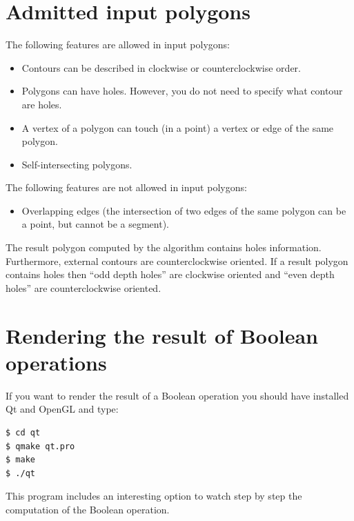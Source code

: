 \documentclass[a4paper]{article}
\begin{document}
\section{Admitted input polygons}

The following features are allowed in input polygons:
\begin{itemize}
 \item Contours can be described in clockwise or counterclockwise order.
 \item Polygons can have holes. However, you do not need to specify what contour are holes.
 \item A vertex of a polygon can touch (in a point) a vertex or edge of the same polygon.
 \item Self-intersecting polygons.
\end{itemize}

The following features are not allowed in input polygons:
\begin{itemize}
 \item Overlapping edges (the intersection of two edges of the same polygon can be a point, but cannot be a segment).
\end{itemize}

The result polygon computed by the algorithm contains holes information. Furthermore, external contours are counterclockwise oriented. If a
result polygon contains holes then ``odd depth holes'' are clockwise oriented and ``even depth holes'' are counterclockwise oriented.


%
%

\section{Rendering the result of Boolean operations}

If you want to render the result of a Boolean operation you should have installed Qt and OpenGL and type:

\begin{verbatim}
$ cd qt
$ qmake qt.pro
$ make
$ ./qt
\end{verbatim}

This program includes an interesting option to watch step by step the computation of the Boolean operation.
\end{document}
